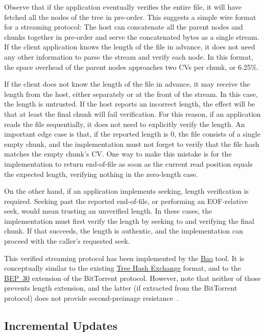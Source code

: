 \documentclass[11pt,notitlepage,a4paper]{article}
\begin{document}
Observe that if the application eventually verifies the entire file, it will
have fetched all the nodes of the tree in pre-order. This suggests a simple
wire format for a streaming protocol: The host can concatenate all the parent
nodes and chunks together in pre-order and serve the concatenated bytes as a
single stream. If the client application knows the length of the file in
advance, it does not need any other information to parse the stream and verify
each node. In this format, the space overhead of the parent nodes approaches
two CVs per chunk, or 6.25\%.

If the client does not know the length of the file in advance, it may receive
the length from the host, either separately or at the front of the stream. In
this case, the length is untrusted. If the host reports an incorrect length,
the effect will be that at least the final chunk will fail verification. For
this reason, if an application reads the file sequentially, it does not need to
explicitly verify the length. An important edge case is that, if the reported
length is 0, the file consists of a single empty chunk, and the implementation
must not forget to verify that the file hash matches the empty chunk's CV. One
way to make this mistake is for the implementation to return end-of-file as
soon as the current read position equals the expected length, verifying nothing
in the zero-length case.

On the other hand, if an application implements seeking, length verification is
required. Seeking past the reported end-of-file, or performing an EOF-relative
seek, would mean trusting an unverified length. In these cases, the
implementation must first verify the length by seeking to and verifying the
final chunk. If that succeeds, the length is authentic, and the implementation
can proceed with the caller's requested seek.

This verified streaming protocol has been implemented by the
\href{https://github.com/oconnor663/bao}{Bao} tool. It is conceptually similar
to the existing
\href{https://adc.sourceforge.io/draft-jchapweske-thex-02.html}{Tree Hash
Exchange} format, and to the
\href{https://www.bittorrent.org/beps/bep_0030.html}{BEP~30} extension of the
BitTorrent protocol. However, note that neither of those prevents length
extension, and the latter (if extracted from the BitTorrent protocol) does not
provide second-preimage resistance~\cite[\S8.5]{DBLP:journals/tosc/DaemenMA18}.

\subsection{Incremental Updates}\label{sec:incrementalupdate}
\end{document}

